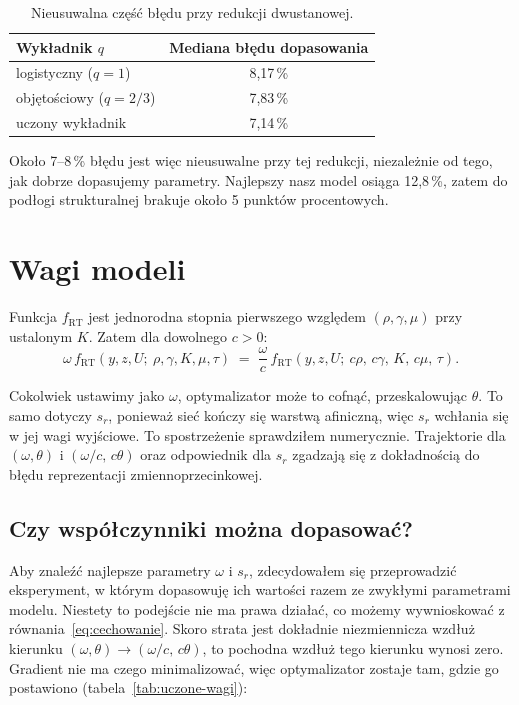 \documentclass[11pt,a4paper]{article}
\begin{document}
\begin{table}[H]
\centering\small
\begin{tabular}{@{}lc@{}}
\toprule
\textbf{Wykładnik $q$} & \textbf{Mediana błędu dopasowania}\\
\midrule
logistyczny ($q=1$)      & 8,17\,\%\\
objętościowy ($q=2/3$)   & 7,83\,\%\\
uczony wykładnik         & 7,14\,\%\\
\bottomrule
\end{tabular}
\caption{Nieusuwalna część błędu przy redukcji dwustanowej.}
\label{tab:necessary-error}
\end{table}

Około 7--8\,\% błędu jest więc nieusuwalne przy tej redukcji, niezależnie od tego, jak
dobrze dopasujemy parametry. Najlepszy nasz model osiąga 12,8\,\%, zatem do podłogi
strukturalnej brakuje około 5 punktów procentowych.

\section{Wagi modeli}
\label{sec:cechowanie}

Funkcja $f_{\mathrm{RT}}$ jest jednorodna stopnia pierwszego względem
$(\rho,\gamma,\mu)$ przy ustalonym $K$. Zatem dla dowolnego $c>0$:
\begin{equation}
\omega\, f_{\mathrm{RT}}(y,z,U;\ \rho,\gamma,K,\mu,\tau)
\;=\;
\frac{\omega}{c}\, f_{\mathrm{RT}}(y,z,U;\ c\rho,\,c\gamma,\,K,\,c\mu,\,\tau).
\label{eq:cechowanie}
\end{equation}

Cokolwiek ustawimy jako $\omega$, optymalizator może to cofnąć,
przeskalowując $\theta$. To samo dotyczy $s_r$, ponieważ sieć kończy się warstwą afiniczną,
więc $s_r$ wchłania się w jej wagi wyjściowe. To spostrzeżenie sprawdziłem numerycznie. Trajektorie dla $(\omega,\theta)$ i $(\omega/c,\,c\theta)$ oraz odpowiednik dla $s_r$ zgadzają się z dokładnością do błędu reprezentacji zmiennoprzecinkowej.

\subsection{Czy współczynniki można dopasować?}
\label{sec:uczone-wagi}

Aby znaleźć najlepsze parametry $\omega$ i $s_r$, zdecydowałem się przeprowadzić eksperyment, w którym dopasowuję ich wartości razem ze zwykłymi parametrami modelu. Niestety to podejście nie ma prawa działać, co możemy wywnioskować z równania~\eqref{eq:cechowanie}. Skoro strata jest dokładnie niezmiennicza wzdłuż kierunku
$(\omega,\theta) \rightarrow (\omega/c,\,c\theta)$, to pochodna wzdłuż tego kierunku wynosi
zero. Gradient nie ma czego minimalizować, więc optymalizator zostaje tam, gdzie go
postawiono (tabela~\ref{tab:uczone-wagi}):
\end{document}

